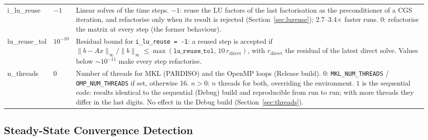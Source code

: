 \documentclass[11pt,a4paper]{article}
\begin{document}
\begin{longtable}{>{\ttfamily}p{3.2cm} p{1.5cm} p{9cm}}
i\_lu\_reuse & $-1$ &
  Linear solves of the time steps.
  $-1$: reuse the LU factors of the last factorisation as the preconditioner of a
  CGS iteration, and refactorise only when its result is rejected
  (Section~\ref{sec:lureuse}); 2.7--3.4$\times$ faster runs.
  $0$: refactorise the matrix at every step (the former behaviour). \\[4pt]

lu\_reuse\_tol & $10^{-10}$ &
  Residual bound for \texttt{i\_lu\_reuse = -1}: a reused step is accepted if
  $\|b - A x\|_\infty/\|b\|_\infty \le \max(\texttt{lu\_reuse\_tol},\,
  10\,r_\mathrm{direct})$, with $r_\mathrm{direct}$ the residual of the latest
  direct solve.  Values below ${\sim}10^{-11}$ make every step refactorise. \\[4pt]

n\_threads & $0$ &
  Number of threads for MKL (PARDISO) and the OpenMP loops (Release build).
  $0$: \texttt{MKL\_NUM\_THREADS} / \texttt{OMP\_NUM\_THREADS} if set, otherwise
  16.  $n>0$: $n$ threads for both, overriding the environment.  $1$ is the
  sequential code: results identical to the sequential (Debug) build and
  reproducible from run to run; with more threads they differ in the last
  digits.  No effect in the Debug build (Section~\ref{sec:threads}). \\[4pt]

\end{longtable}

\subsection{Steady-State Convergence Detection}
\end{document}
